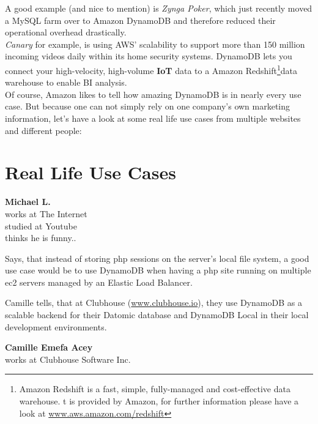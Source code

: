 A good example (and nice to mention) is \textit{Zynga Poker}, which just recently moved a MySQL farm over to Amazon DynamoDB and therefore reduced their operational overhead drastically.\cite{aws} \\

\textit{Canary} for example, is using AWS' scalability to support more than 150 million incoming videos daily within its home security systems. DynamoDB lets you connect your high-velocity, high-volume \textbf{IoT} data to a Amazon Redshift\footnote{Amazon Redshift is a fast, simple, fully-managed and cost-effective data warehouse. t is provided by Amazon, for further information please have a look at \href{https://aws.amazon.com/redshift/}{www.aws.amazon.com/redshift}}data warehouse to enable BI analysis.\cite{aws}\\

Of course, Amazon likes to tell how amazing DynamoDB is in nearly every use case. But because one can not simply rely on one company's own marketing information, let's have a look at some real life use cases from multiple websites and different people:\\


\section{Real Life Use Cases}

\vspace{10pt}
\begin{minipage}[t]{4cm}
\textbf{Michael L.} \\
		works at The Internet \\
		studied at Youtube \\
		thinks he is funny..\\
\end{minipage}
\hfill
\begin{minipage}[t]{10cm}
Says, that instead of storing php sessions on the server's local file system, a good use case would be to use DynamoDB when having a php site running on multiple ec2 servers managed by an Elastic Load Balancer.\cite{user-stories} \\
\end{minipage}

	
\vspace{20pt}


\hspace{-20pt}
\begin{minipage}[t]{9cm}
Camille tells, that at Clubhouse (\href{https://clubhouse.io}{www.clubhouse.io}), they use DynamoDB as a scalable backend for their Datomic database and DynamoDB Local in their local development environments.\cite{user-stories}\\
\end{minipage}
\hfill
\begin{minipage}[t]{4.5cm}
\textbf{Camille Emefa Acey}\\
works at Clubhouse Software Inc.\\
\end{minipage}

